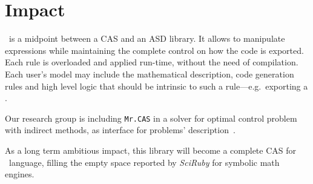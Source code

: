 
\section{Impact}
\label{sec:impact}

\ragnicas~is a midpoint between a CAS and an ASD library. It allows to manipulate expressions while maintaining the complete control on how the code is exported. Each rule is overloaded and applied run-time, without the need of compilation. Each user's model may include the mathematical description, code generation rules and high level logic that should be intrinsic to such a rule---e.g.~exporting a .

Our research group is including \texttt{Mr.CAS} in a solver for optimal control problem with indirect methods, as interface for problems' description~\cite{biral2016notes}.

As a long term ambitious impact, this library will become a complete CAS for \Ruby~language, filling the empty space reported by \emph{SciRuby} for symbolic math engines.
